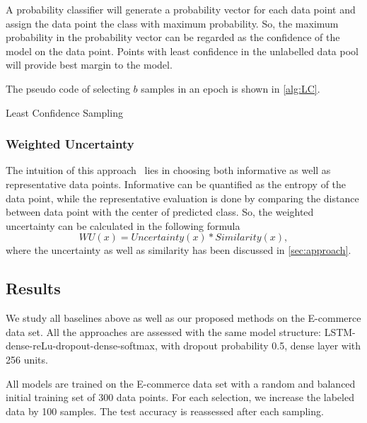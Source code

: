 A probability classifier will generate a probability vector for each data point and assign the data point the class with maximum probability. So, the maximum probability in the probability vector can be regarded as the confidence of the model on the data point. Points with least confidence in the unlabelled data pool will provide best margin to the model. 

The pseudo code of selecting $b$ samples in an epoch is shown in \ref{alg:LC}.
\begin{algorithm}
\small
\caption{Least Confidence Sampling}
\label{alg:LC}
\begin{algorithmic}
\ENDWHILE
\end{algorithmic}
\end{algorithm}

\subsubsection*{Weighted Uncertainty}
The intuition of this approach~\cite{zhao2017deep} lies in choosing both informative as well as representative data points. Informative can be quantified as the entropy of the data point, while the representative evaluation is done by comparing the distance between data point with the center of predicted class. So, the weighted uncertainty can be calculated in the following formula
$$WU(x) = Uncertainty(x)*Similarity(x),$$
where the uncertainty as well as similarity has been discussed in \ref{sec:approach}.

\subsection{Results}
We study all baselines above as well as our proposed methods on the E-commerce data set. All the approaches are assessed with the same model structure: LSTM-dense-reLu-dropout-dense-softmax, with dropout probability 0.5, dense layer with 256 units.

All models are trained on the E-commerce data set with a random and balanced initial training set of 300 data points. For each selection, we increase the labeled data by 100 samples. The test accuracy is reassessed after each sampling.
\label{sec:exp}

